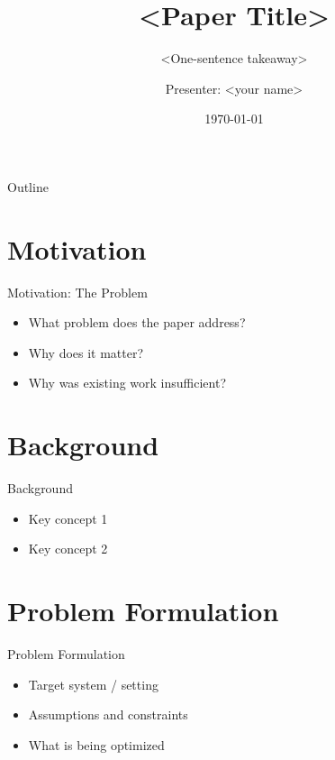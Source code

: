 \documentclass[aspectratio=169]{beamer}
\title{<Paper Title>}
\subtitle{<One-sentence takeaway>}
\author{Presenter: <your name>}
\institute{Paper: <Authors>, <Venue/Year>}
\date{\today}
\begin{document}
\begin{frame}[plain]
  \titlepage
\end{frame}

\begin{frame}{Outline}
  \tableofcontents
\end{frame}


\section{Motivation}
\begin{frame}{Motivation: The Problem}
  \begin{itemize}
    \item What problem does the paper address?
    \item Why does it matter?
    \item Why was existing work insufficient?
  \end{itemize}
\end{frame}

\section{Background}
\begin{frame}{Background}
  \begin{itemize}
    \item Key concept 1
    \item Key concept 2
  \end{itemize}
\end{frame}

\section{Problem Formulation}
\begin{frame}{Problem Formulation}
  \begin{itemize}
    \item Target system / setting
    \item Assumptions and constraints
    \item What is being optimized
  \end{itemize}
\end{frame}
\end{document}

